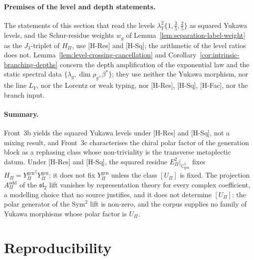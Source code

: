 \documentclass[11pt]{article}
\theoremstyle{definition}
\theoremstyle{remark}
\newcommand{\Jthree}{J_{3}}
\newcommand{\Cgen}{\mathbb{C}^{3}_{\mathrm{gen}}}
\newcommand{\Epi}{E_{\Pi}}
\newcommand{\LY}{L_{Y}}
\newcommand{\Ygen}{{Y^{\mathrm{gen}}_{\Pi}}}
\newcommand{\Hpi}{H_{\Pi}}
\newcommand{\Upi}{U_{\Pi}}
\newcommand{\Aodd}{A_{\Pi}^{\mathrm{odd}}}
\newcommand{\lamY}{\lambda_{Y}}
\newcommand{\Sym}{\mathrm{Sym}}
\begin{document}
    \paragraph{Premises of the level and depth statements.}
      The statements of this section that read the levels $\lamY^{2}\{1, \tfrac35, \tfrac25\}$ as squared Yukawa
      levels, and the Schur-residue weights $w_g$ of Lemma~\ref{lem:separation-label-weight} as the
      $\Jthree$-triplet of $\Hpi$, use [H-Res] and [H-Sq]; the arithmetic of the level ratios does not.
      Lemma~\ref{lem:level-crossing-cancellation} and Corollary~\ref{cor:intrinsic-branching-depths} concern the
      depth amplification of the exponential law and the static spectral data $\{\lambda_g, \dim\rho_g, \beta^{\ast}\}$;
      they use neither the Yukawa morphism, nor the line $\LY$, nor the Lorentz or weak typing, nor
      [H-Res], [H-Sq], [H-Fac], nor the branch input.

    \paragraph{Summary.}
      Front~3b yields the squared Yukawa levels under [H-Res] and [H-Sq], not a mixing result, and Front~3c
      characterises the chiral polar factor of the generation block as a rephasing class whose non-triviality is the
      transverse metaplectic datum.
      Under [H-Res] and [H-Sq], the squared residue $\Epi^{2}|_{\Cgen}$ fixes $\Hpi = \Ygen^{\dagger}\Ygen$; it does not
      fix $\Ygen$ unless the class $[\Upi]$ is fixed.
      The projection $\Aodd$ of the $\mathfrak{sl}_{2}$ lift vanishes by representation theory for every complex
      coefficient, a modelling choice that no source justifies, and it does not determine $[\Upi]$:
      the polar generator of the $\Sym^{2}$ lift is non-zero, and the corpus supplies no family of Yukawa morphisms
      whose polar factor is $\Upi$.

  \section{Reproducibility}
    \label{sec:repro}
\end{document}

